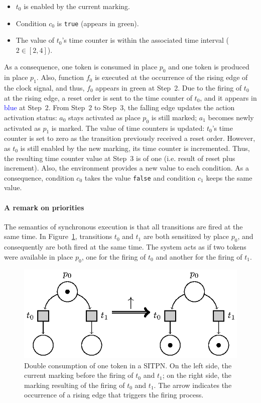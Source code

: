 \documentclass[pdflatex,sn-mathphys]{sn-jnl}%
\theoremstyle{thmstyleone}%
\theoremstyle{thmstyletwo}%
\theoremstyle{thmstylethree}%
\begin{document}
\begin{itemize}[label=--]
\item $t_0$ is enabled by the current marking.
\item Condition $c_0$ is \texttt{true} (appears in green).
  
\item The value of $t_0$'s time counter is within the associated time
  interval ($2\in[2,4]$).
\end{itemize}

As a consequence, one token is consumed in place $p_0$ and one token
is produced in place $p_1$. Also, function $f_0$ is executed at the
occurrence of the rising edge of the clock signal, and thus, $f_0$
appears in green at Step~2. Due to the firing of $t_0$ at the rising
edge, a reset order is sent to the time counter of $t_0$, and it
appears in \textcolor{blue}{blue} at Step~2. From Step~2 to Step~3,
the falling edge updates the action activation status: $a_0$ stays
activated as place $p_0$ is still marked; $a_1$ becomes newly
activated as $p_1$ is marked. The value of time counters is updated:
$t_0$'s time counter is set to zero as the transition previously
received a reset order. However, as $t_0$ is still enabled by the new
marking, its time counter is incremented. Thus, the resulting time
counter value at Step~3 is of one (i.e. result of reset plus
increment). Also, the environment provides a new value to each
condition. As a consequence, condition $c_0$ takes the value
\texttt{false} and condition $c_1$ keeps the same value.

\paragraph{A remark on priorities}

The semantics of synchronous execution is that all transitions are
fired at the same time. In Figure~\ref{fig:double-consum}, transitions
$t_0$ and $t_1$ are both sensitized by place $p_0$, and consequently
are both fired at the same time. The system acts as if two tokens were
available in place $p_0$, one for the firing of $t_0$ and another for
the firing of $t_1$.

\begin{figure}[H]
  \centering
  \includegraphics[keepaspectratio=true, width=.6\textwidth]{double-consum.eps}
  \caption[Double consumption of token in a SITPN.]{Double consumption
    of one token in a SITPN. On the left side, the current marking
    before the firing of $t_0$ and $t_1$; on the right side, the
    marking resulting of the firing of $t_0$ and $t_1$. The arrow
    indicates the occurrence of a rising edge that triggers the firing
    process.}
  \label{fig:double-consum}
\end{figure}
\end{document}
